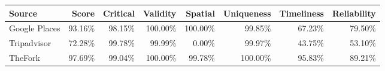 {\tiny
\begin{tabular}{lrrrrrrr}
\toprule
Source & Score & Critical & Validity & Spatial & Uniqueness & Timeliness & Reliability \\
\midrule
Google Places & 93.16\% & 98.15\% & 100.00\% & 100.00\% & 99.85\% & 67.23\% & 79.50\% \\
Tripadvisor & 72.28\% & 99.78\% & 99.99\% & 0.00\% & 99.97\% & 43.75\% & 53.10\% \\
TheFork & 97.69\% & 99.04\% & 100.00\% & 99.78\% & 100.00\% & 95.83\% & 89.21\% \\
\bottomrule
\end{tabular}
}
